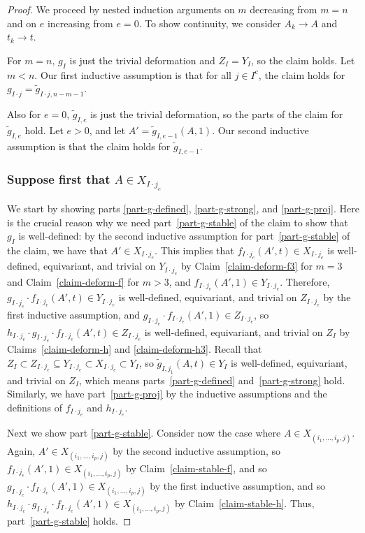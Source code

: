 \documentclass[JEP,XML,SOM,Unicode,NoFloatCountersInSection,published]{cedram}
\theoremstyle{remark}
\newcommand{\compl}[1]{{{#1}^{\text{c}}}}
\begin{document}
\begin{proof}
We proceed by nested induction arguments on $m$ decreasing from $m=n$ and on $e$ increasing from $e=0$. To show continuity, we consider $A_k \to A$ and $t_k \to t$.

For $m = n$, $g_I$ is just the trivial deformation and $Z_I = Y_I$, so the claim holds. Let $m < n$. Our first inductive assumption is that for all $j\in \compl{I}$, the claim holds for $g_{I\cdot j} = \tilde g_{I\cdot j,n-m-1}$.

Also for $e=0$, $\tilde g_{I,e}$ is just the trivial deformation, so the parts of the claim for $\tilde g_{I,e}$ hold.
Let $e > 0$, and let $A' = \tilde g_{I,e-1}(A,1)$. Our second inductive assumption is that the claim holds for $\tilde g_{I,e-1}$.

\subsubsection*{Suppose first that $A \in X_{I\cdot j_e}$}

We start by showing parts \eqref{part-g-defined}, \eqref{part-g-strong}, and \eqref{part-g-proj}.
Here is the crucial reason why we need part~\eqref{part-g-stable} of the claim to show that $g_I$ is well-defined: by the second inductive assumption for part~\eqref{part-g-stable} of the claim, we have that $A' \in X_{I\cdot j_e}$. This implies that $f_{I\cdot j_e}(A',t) \in X_{I\cdot j_e}$ is well-defined, equivariant, and trivial on $Y_{I\cdot j_e}$ by Claim~\ref{claim-deform-f3} for $m=3$ and Claim~\ref{claim-deform-f} for $m>3$, and $f_{I\cdot j_e}(A',1) \in Y_{I\cdot j_e}$.
Therefore, $g_{I\cdot j_e} \cdot f_{I\cdot j_e}(A',t) \in Y_{I\cdot j_e}$ is well-defined, equivariant, and trivial on $Z_{I\cdot j_e}$ by the first inductive assumption, and $g_{I\cdot j_e} \cdot f_{I\cdot j_e}(A',1) \in Z_{I\cdot j_e}$, so $h_{I\cdot j_e}\cdot g_{I\cdot j_e}\cdot f_{I\cdot j_e}(A',t) \in Z_{I\cdot j_e}$ is well-defined, equivariant, and trivial on $Z_I$ by Claims~\ref{claim-deform-h} and \ref{claim-deform-h3}.
Recall that $Z_I \subset Z_{I\cdot j_e} \subseteq Y_{I\cdot j_e} \subset X_{I\cdot j_e} \subset Y_I$, so $\tilde g_{I, j_1}({A},t) \in Y_I$ is well-defined, equivariant, and trivial on $Z_I$, which means parts~\eqref{part-g-defined} and~\eqref{part-g-strong} hold.
Similarly, we have part~\eqref{part-g-proj} by the inductive assumptions and the definitions of $f_{I\cdot j_e}$ and $h_{I\cdot j_e}$.

Next we show part \eqref{part-g-stable}.
Consider now the case where $A \in X_{(i_1,\dots,i_{p},j)}$.
Again, $A' \in X_{(i_1,\dots,i_{p},j)}$ by the second inductive assumption, so $f_{I\cdot j_e}(A',1) \in X_{(i_1,\dots,i_{p},j)}$ by Claim~\ref{claim-stable-f}, and so $g_{I\cdot j_e}\cdot f_{I\cdot j_e}(A',1) \in X_{(i_1,\dots,i_{p},j)}$ by the first inductive assumption, and so $h_{I\cdot j_e}\cdot g_{I\cdot j_e}\cdot f_{I\cdot j_e}(A',1) \in X_{(i_1,\dots,i_{p},j)}$ by Claim~\ref{claim-stable-h}.
Thus, part~\eqref{part-g-stable} holds.


\end{proof}
\end{document}
